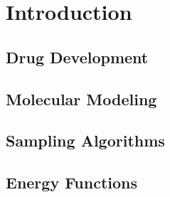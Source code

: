 \chapter{Introduction}
\label{chapter:intro}

\section{Drug Development}
\label{section:drug_development}


\section{Molecular Modeling}
\label{section:molecular_modeling}


\section{Sampling Algorithms}
\label{section:sampling_algorithms}


\section{Energy Functions}
\label{section:energy_functions}

